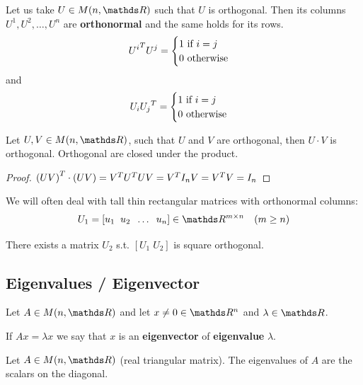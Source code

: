 \documentclass[computationalMathematics.tex]{subfiles}
\begin{document}
\begin{proposition}
  Let us take $U \in M(n, \R)$ such that $U$ is orthogonal. Then its columns $U^1, U^2, \ldots, U^n$ are \textbf{orthonormal} and the same holds for its rows.
  \[
  {U^i}^{T} U^j = \begin{cases}
    1 \text{ if } i=j\\
    0 \text{ otherwise}
  \end{cases}
  \]
  and
  \[
    U_i {U_j}^{T} = \begin{cases}
    1 \text{ if } i=j\\
    0 \text{ otherwise}
  \end{cases}
  \]
\end{proposition}

\begin{proposition}
  Let $U, V \in M(n, \R)$, such that $U$ and $V$ are orthogonal, then $U \cdot V$ is orthogonal. Orthogonal are closed under the product.
\end{proposition}
\begin{proof}
  ${(UV)}^{T} \cdot (UV) = {V}^{T} {U}^{T} U V = {V}^{T} I_n V = {V}^{T} V = I_n$
\end{proof}


\begin{proposition}
We will often deal with tall thin rectangular matrices with
orthonormal columns:
$$ U_1 = [u_1 \; \; u_2 \; \; \dots \; \; u_n] \in \R^{m \times n} \quad (m \geq n)$$

There exists a matrix $U_2$ s.t. $[U_1 \; U_2]$ is square orthogonal.

  
\end{proposition}

\subsection{Eigenvalues / Eigenvector}

\begin{definition}
  Let $A \in M(n, \R)$ and let $x \neq 0 \in \R^n$ and $\lambda \in \R$.

  If $Ax = \lambda x$ we say that $x$ is an \textbf{eigenvector} of \textbf{eigenvalue} $\lambda$.
\end{definition}

\begin{proposition}
  Let $A \in M(n, \R)$ (real triangular matrix). The eigenvalues of $A$ are the scalars on the diagonal.
\end{proposition}
\end{document}
